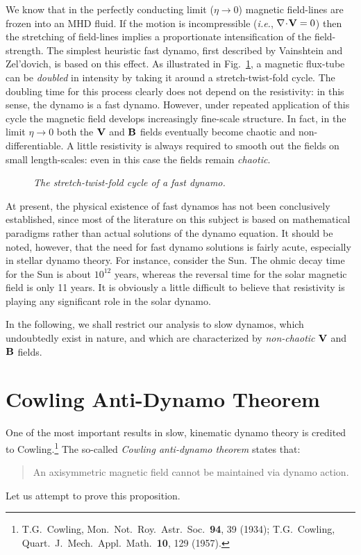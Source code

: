 We know that in the perfectly conducting limit ($\eta\rightarrow 0$) magnetic
field-lines are frozen into an MHD fluid. If the motion is
incompressible ({\em i.e.}, $\nabla\!\cdot\!{\bf V} = 0$) then the stretching
of field-lines implies a proportionate intensification of the field-strength.
The simplest heuristic fast dynamo, first described by Vainshtein and Zel'dovich, 
 is based on this effect. As illustrated in Fig.~\ref{f25}, a magnetic
flux-tube can be {\em doubled} in intensity by taking it around a
stretch-twist-fold cycle. The doubling time for this
process clearly does not depend on the resistivity: in this sense, the
dynamo is a fast dynamo. However, under repeated application of this
cycle the magnetic field develops increasingly fine-scale structure.
In fact, in the limit $\eta\rightarrow 0$ both the ${\bf V}$ and
${\bf B}$ fields eventually become chaotic and non-differentiable.
A little resistivity is always required to smooth out the fields on
small length-scales: even in this case the fields remain {\em chaotic}.

\begin{figure}
\epsfysize=1.75in
\centerline{}
\caption{\em The stretch-twist-fold cycle of a fast dynamo.}\label{f25}
\end{figure}

At present, the physical existence of fast dynamos  has not been
conclusively  established, since most of the literature on this
subject is based on mathematical paradigms rather than actual solutions
of the dynamo equation. It should be noted, however, that the
need for fast dynamo solutions is fairly acute, especially in stellar
dynamo theory. For instance, consider the Sun. The ohmic decay time for the
Sun is about $10^{12}$ years, whereas the reversal time for the solar magnetic
field is only 11 years. It is obviously a little difficult to believe that resistivity
is playing any significant role in the solar dynamo.  

In the following, we shall restrict our analysis to slow dynamos, which
undoubtedly exist in nature, and which are characterized by {\em non-chaotic}
${\bf V}$ and ${\bf B}$ fields.

\section{Cowling Anti-Dynamo Theorem}
One of the most important results in slow, kinematic dynamo theory
is credited to Cowling.\footnote{T.G.~Cowling, Mon.\ Not.\ Roy.\ Astr.\ Soc.\
{\bf 94}, 39 (1934); T.G.~Cowling, Quart.\ J.\ Mech.\ Appl.\ Math.\
{\bf 10}, 129 (1957).} The so-called {\em Cowling anti-dynamo theorem}
states that:
\begin{quote}
{\sf An axisymmetric magnetic field cannot be maintained via dynamo action.}
\end{quote}
Let us attempt to prove this proposition.

